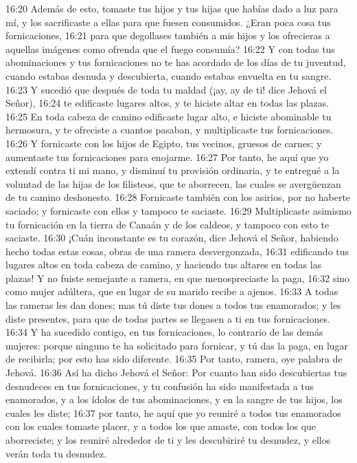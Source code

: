 16:20 Además de esto, tomaste tus hijos y tus hijas que habías dado a luz para mí, y los sacrificaste a ellas para que fuesen consumidos. ¿Eran poca cosa tus fornicaciones,   
16:21 para que degollases también a mis hijos y los ofrecieras a aquellas imágenes como ofrenda que el fuego consumía?   
16:22 Y con todas tus abominaciones y tus fornicaciones no te has acordado de los días de tu juventud, cuando estabas desnuda y descubierta, cuando estabas envuelta en tu sangre.   
16:23 Y sucedió que después de toda tu maldad (¡ay, ay de ti! dice Jehová el Señor),   
16:24 te edificaste lugares altos, y te hiciste altar en todas las plazas.   
16:25 En toda cabeza de camino edificaste lugar alto, e hiciste abominable tu hermosura, y te ofreciste a cuantos pasaban, y multiplicaste tus fornicaciones.   
16:26 Y fornicaste con los hijos de Egipto, tus vecinos, gruesos de carnes; y aumentaste tus fornicaciones para enojarme.   
16:27 Por tanto, he aquí que yo extendí contra ti mi mano, y disminuí tu provisión ordinaria, y te entregué a la voluntad de las hijas de los filisteos, que te aborrecen, las cuales se avergüenzan de tu camino deshonesto.   
16:28 Fornicaste también con los asirios, por no haberte saciado; y fornicaste con ellos y tampoco te saciaste.   
16:29 Multiplicaste asimismo tu fornicación en la tierra de Canaán y de los caldeos, y tampoco con esto te saciaste.   
16:30 ¡Cuán inconstante es tu corazón, dice Jehová el Señor, habiendo hecho todas estas cosas, obras de una ramera desvergonzada,   
16:31 edificando tus lugares altos en toda cabeza de camino, y haciendo tus altares en todas las plazas! Y no fuiste semejante a ramera, en que menospreciaste la paga,   
16:32 sino como mujer adúltera, que en lugar de su marido recibe a ajenos.   
16:33 A todas las rameras les dan dones; mas tú diste tus dones a todos tus enamorados; y les diste presentes, para que de todas partes se llegasen a ti en tus fornicaciones.   
16:34 Y ha sucedido contigo, en tus fornicaciones, lo contrario de las demás mujeres: porque ninguno te ha solicitado para fornicar, y tú das la paga, en lugar de recibirla; por esto has sido diferente.   
16:35 Por tanto, ramera, oye palabra de Jehová.   
16:36 Así ha dicho Jehová el Señor: Por cuanto han sido descubiertas tus desnudeces en tus fornicaciones, y tu confusión ha sido manifestada a tus enamorados, y a los ídolos de tus abominaciones, y en la sangre de tus hijos, los cuales les diste;   
16:37 por tanto, he aquí que yo reuniré a todos tus enamorados con los cuales tomaste placer, y a todos los que amaste, con todos los que aborreciste; y los reuniré alrededor de ti y les descubiriré tu desnudez, y ellos verán toda tu desnudez.   
